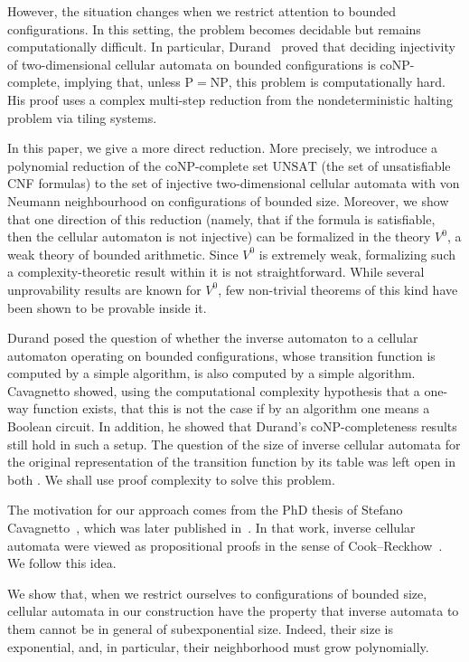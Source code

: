 \documentclass{article}
\theoremstyle{plain}
\theoremstyle{definition}
\begin{document}
However, the situation changes when we restrict attention to bounded configurations. In this setting, the problem becomes decidable but remains computationally difficult. In particular, Durand~\cite{DURAND1994387} proved that deciding injectivity of two-dimensional cellular automata on bounded configurations is coNP-complete, implying that, unless $\mathrm{P} = \mathrm{NP}$, this problem is computationally hard. His proof uses a complex multi-step reduction from the nondeterministic halting problem via tiling systems.

In this paper, we give a more direct reduction. More precisely, we introduce a polynomial reduction of the coNP-complete set $\mathrm{UNSAT}$ (the set of unsatisfiable CNF formulas) to the set of injective two-dimensional cellular automata with von Neumann neighbourhood on configurations of bounded size. Moreover, we show that one direction of this reduction (namely, that if the formula is satisfiable, then the cellular automaton is not injective) can be formalized in the theory $V^0$, a weak theory of bounded arithmetic. Since $V^0$ is extremely weak, formalizing such a complexity-theoretic result within it is not straightforward. While several unprovability results are known for $V^0$, few non-trivial theorems of this kind have been shown to be provable inside it.

Durand \cite[Sec.~4]{DURAND1994387} posed the question of whether the inverse automaton to a cellular automaton operating on bounded configurations, whose transition function is computed by a simple algorithm, is also computed by a simple algorithm. Cavagnetto \cite[Sec.~3.3]{Cavagnetto} showed, using the computational complexity hypothesis that a one-way function exists, that this is not the case if by an algorithm one means a Boolean circuit. In addition, he showed that Durand’s coNP-completeness results still hold in such a setup. The question of the size of inverse cellular automata for the original representation of the transition function by its table was left open in both \cite{DURAND1994387,Cavagnetto}. We shall use proof complexity to solve this problem.

The motivation for our approach comes from the PhD thesis of Stefano Cavagnetto~\cite{Cavagnetto}, which was later published in~\cite{Cavagnetto2011}. In that work, inverse cellular automata were viewed as propositional proofs in the sense of Cook--Reckhow~\cite{cook1979relative}. We follow this idea.

We show that, when we restrict ourselves to configurations of bounded size, cellular automata in our construction have the property that inverse automata to them cannot be in general of subexponential size. Indeed, their size is exponential, and, in particular, their neighborhood must grow polynomially.
\end{document}

